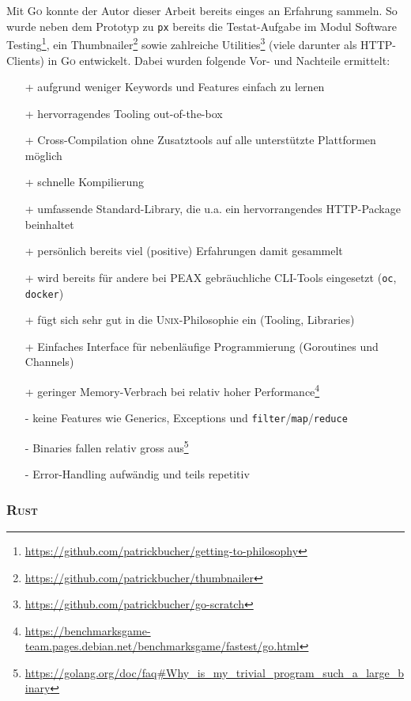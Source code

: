 Mit \textsc{Go} konnte der Autor dieser Arbeit bereits einges an Erfahrung sammeln. So wurde neben dem Prototyp zu \texttt{px} bereits die Testat-Aufgabe im Modul Software Testing\footnote{\url{https://github.com/patrickbucher/getting-to-philosophy}}, ein Thumbnailer\footnote{\url{https://github.com/patrickbucher/thumbnailer}} sowie zahlreiche Utilities\footnote{\url{https://github.com/patrickbucher/go-scratch}} (viele darunter als HTTP-Clients) in \textsc{Go} entwickelt. Dabei wurden folgende Vor- und Nachteile ermittelt:

\begin{itemize}
    \item[+] aufgrund weniger Keywords und Features einfach zu lernen
    \item[+] hervorragendes Tooling out-of-the-box
    \item[+] Cross-Compilation ohne Zusatztools auf alle unterstützte Plattformen möglich
    \item[+] schnelle Kompilierung
    \item[+] umfassende Standard-Library, die u.a. ein hervorrangendes HTTP-Package beinhaltet
    \item[+] persönlich bereits viel (positive) Erfahrungen damit gesammelt
    \item[+] wird bereits für andere bei PEAX gebräuchliche CLI-Tools eingesetzt (\texttt{oc}, \texttt{docker})
    \item[+] fügt sich sehr gut in die \textsc{Unix}-Philosophie ein (Tooling, Libraries)
    \item[+] Einfaches Interface für nebenläufige Programmierung (Goroutines und Channels)
    \item[+] geringer Memory-Verbrach bei relativ hoher Performance\footnote{\url{https://benchmarksgame-team.pages.debian.net/benchmarksgame/fastest/go.html}}
    \item[-] keine Features wie Generics, Exceptions und \texttt{filter}/\texttt{map}/\texttt{reduce}
    \item[-] Binaries fallen relativ gross aus\footnote{\url{https://golang.org/doc/faq\#Why\_is\_my\_trivial\_program\_such\_a\_large\_binary}}
    \item[-] Error-Handling aufwändig und teils repetitiv
\end{itemize}

\subsubsection{\textsc{Rust}}

